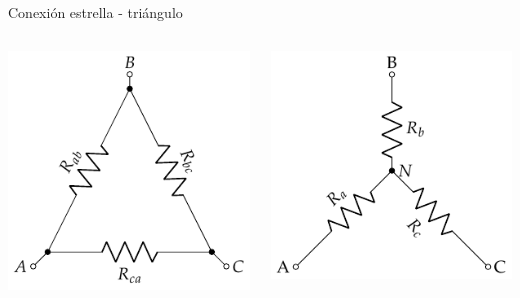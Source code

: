 \documentclass[aspectratio=169, xcolor={usenames,svgnames,dvipsnames}]{beamer}
\begin{document}

\begin{frame}{Conexión estrella - triángulo}
    \begin{columns}
    \begin{column}{0.5\columnwidth}
    \begin{center}
    \includegraphics[width=.9\linewidth]{../figs/Conexion_Triangulo.pdf}
    \end{center}
    \end{column}
    \begin{column}{0.5\columnwidth}
    \begin{center}
    \includegraphics[width=.9\linewidth]{../figs/Conexion_Estrella.pdf}
    \end{center}
    \end{column}
    \end{columns}
\end{frame}
\end{document}
